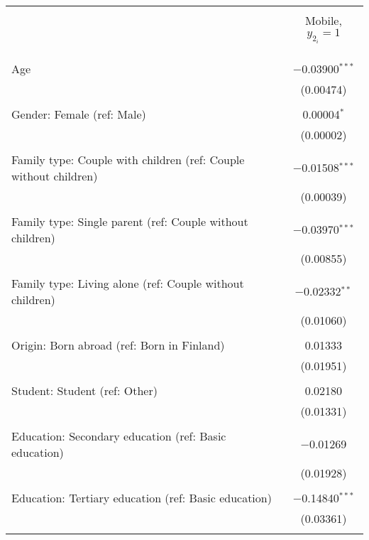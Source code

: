 
\begin{table}[!htbp] \centering 
  \caption{} 
  \label{} 
\begin{tabular}{@{\extracolsep{5pt}}lc} 
\\[-1.8ex]\hline 
\hline \\[-1.8ex] 
 & \multicolumn{1}{c}{Mobile, $y_{2_i} = 1$} \\ 
\cline{2-2} 
\\[-1.8ex] &  \\ 
\hline \\[-1.8ex] 
 Age & $-$0.03900$^{***}$ \\ 
  & (0.00474) \\ 
  & \\ 
 Gender: Female (ref: Male) & 0.00004$^{*}$ \\ 
  & (0.00002) \\ 
  & \\ 
 Family type: Couple with children (ref: Couple without children) & $-$0.01508$^{***}$ \\ 
  & (0.00039) \\ 
  & \\ 
 Family type: Single parent (ref: Couple without children) & $-$0.03970$^{***}$ \\ 
  & (0.00855) \\ 
  & \\ 
 Family type: Living alone (ref: Couple without children) & $-$0.02332$^{**}$ \\ 
  & (0.01060) \\ 
  & \\ 
 Origin: Born abroad (ref: Born in Finland) & 0.01333 \\ 
  & (0.01951) \\ 
  & \\ 
 Student: Student (ref: Other) & 0.02180 \\ 
  & (0.01331) \\ 
  & \\ 
 Education: Secondary education (ref: Basic education) & $-$0.01269 \\ 
  & (0.01928) \\ 
  & \\ 
 Education: Tertiary education (ref: Basic education) & $-$0.14840$^{***}$ \\ 
  & (0.03361) \\ 
  & \\ 

\end{tabular}
\end{table}
